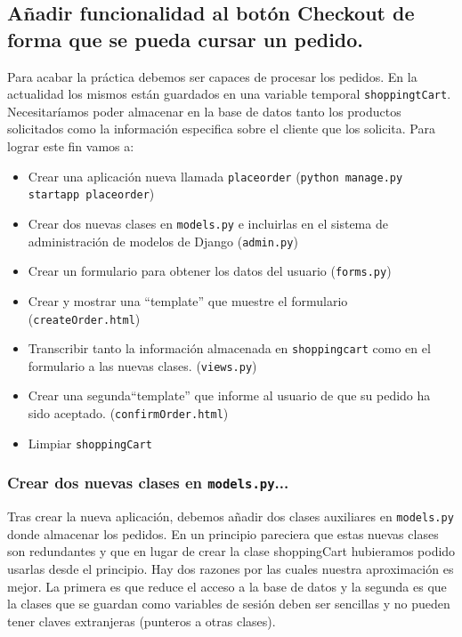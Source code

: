 \documentclass[12pt]{article} %
\newcommand{\ttt}[1]{\texttt{#1}}%
\newcommand{\hhh}[1]{\texttt{#1}}%
\newcommand{\views}{\texttt{views.py}}%
\newcommand{\modelss}{\texttt{models.py}}%
\newcommand{\forms}{\texttt{forms.py}}%
\newcommand{\admin}{\texttt{admin.py}}%
\begin{document}

\subsection{Añadir funcionalidad al botón Checkout de forma que se pueda cursar un pedido.}


Para acabar la práctica debemos ser capaces de procesar los pedidos. En la actualidad los mismos están guardados en una variable temporal \ttt{shoppingtCart}. Necesitaríamos poder almacenar en la base de datos tanto los productos solicitados como  la información especifica sobre el cliente que los solicita. Para lograr este fin vamos a:

\begin{itemize}
 \item Crear una aplicación nueva llamada \ttt{placeorder} (\ttt{python manage.py startapp placeorder})
 \item Crear dos nuevas clases en \modelss{} e incluirlas en el sistema de administración de modelos de Django (\admin)
 \item Crear un formulario para obtener los datos del usuario (\forms)
 \item Crear y mostrar una ``template'' que muestre  el formulario (\hhh{createOrder.html})
 \item Transcribir tanto la información almacenada en \ttt{shoppingcart} como en el formulario a las nuevas clases. (\views)
 \item Crear una segunda``template'' que informe al usuario de que su pedido ha sido aceptado. (\hhh{confirmOrder.html})
 \item Limpiar \ttt{shoppingCart}

\end{itemize}

\subsubsection{Crear dos nuevas clases en \modelss{}... }
Tras crear la nueva aplicación, debemos añadir dos clases auxiliares en \modelss{} donde almacenar los pedidos.
En un principio pareciera que estas nuevas clases son redundantes y que en lugar de crear la clase shoppingCart hubieramos podido usarlas desde el principio. Hay dos razones por las cuales nuestra aproximación es mejor. La primera es que reduce el acceso a la base de datos y la segunda es que la clases que se guardan como variables de sesión deben ser sencillas y no pueden tener claves extranjeras (punteros a otras clases).
\end{document}
